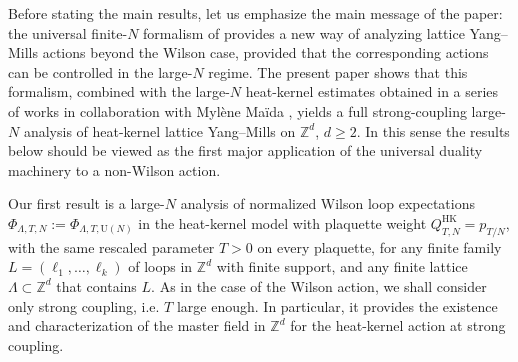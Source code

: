 \documentclass[11pt,a4paper,reqno]{amsart}
\theoremstyle{definition}
\theoremstyle{remark}
\newcommand\U{{\mathrm U}}
\newcommand\Z{{\mathbb{Z}}}
\newcommand\HK{{\mathrm{HK}}}
\begin{document}
Before stating the main results, let us emphasize the main message of the paper: the universal finite-$N$ formalism of \cite{Lem26a} provides a new way of analyzing lattice Yang--Mills actions beyond the Wilson case, provided that the corresponding actions can be controlled in the large-$N$ regime. The present paper shows that this formalism, combined with the large-$N$ heat-kernel estimates obtained in a series of works in collaboration with Myl\`ene Ma\"ida \cite{LemMai25,LM2}, yields a full strong-coupling large-$N$ analysis of heat-kernel lattice Yang--Mills on $\Z^d$, $d\ge 2$. In this sense the results below should be viewed as the first major application of the universal duality machinery to a non-Wilson action.

Our first result is a large-$N$ analysis of normalized Wilson loop expectations $\Phi_{\Lambda,T,N}:=\Phi_{\Lambda,T,\U(N)}$ in the heat-kernel model with plaquette weight $Q^{\HK}_{T,N}=p_{T/N}$, with the same rescaled parameter $T>0$ on every plaquette, for any finite family $L=(\ell_1,\ldots,\ell_k)$ of loops in $\Z^d$ with finite support, and any finite lattice $\Lambda\subset\Z^d$ that contains $L$. As in the case of the Wilson action, we shall consider only strong coupling, i.e. $T$ large enough. In particular, it provides the existence and characterization of the master field in $\Z^d$ for the heat-kernel action at strong coupling.
\end{document}
